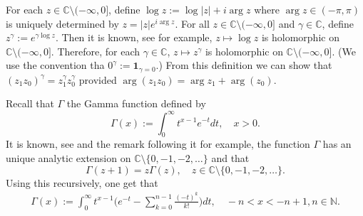 \documentclass[12pt]{amsart}
\theoremstyle{plain}
\theoremstyle{definition}
\numberwithin{equation}{section}
\begin{document}
	For each $z\in \mathbb C\setminus (-\infty,0]$, define
$
	\log z := \log |z| + i \arg z
$
	where $\arg z \in (-\pi,\pi)$ is uniquely determined by
$
	z = |z|e^{i \arg z}.
$ 	
	For all $z\in \mathbb C\setminus (-\infty,0]$ and $\gamma \in \mathbb C$, define
$
	z^\gamma := e^{\gamma \log z}.
$
	Then it is known, see \cite[Theorem 6.1]{SteinShakarchi2003Complex} for example, $z\mapsto \log z$ is holomorphic on $\mathbb C\setminus (-\infty,0]$.
	Therefore, for each $\gamma \in \mathbb C$, $z\mapsto z^\gamma$ is holomorphic on $\mathbb C\setminus (-\infty,0]$.
(We use the convention tha  $0^\gamma := \mathbf 1_{\gamma = 0}$.)
    From this definition we can show that $(z_1z_0)^\gamma = z_1^\gamma z_0^\gamma$ provided $\arg (z_1z_0)=\arg z_1 + \arg(z_0)$.


    Recall that $\Gamma$ the Gamma function defined by
\begin{equation}
    \Gamma (x) := \int_0^\infty t^{x-1} e^{-t}dt,
    \quad x>0.
\end{equation}
	It is known, see \cite[Theorem 6.1.3]{SteinShakarchi2003Complex} and the remark following it for example, the function $\Gamma$ has an unique analytic extension on $\mathbb C\setminus\{0, -1,-2,\dots\}$ and that
\[
	\Gamma(z+1) = z \Gamma(z),\quad z\in \mathbb C\setminus\{0, -1,-2,\dots\}.
\]
	Using this recursively, one get that
\begin{align}
\label{eq: definition of Gamma function}
    \Gamma(x)
    := \int_0^\infty t^{x-1} \Big(e^{-t} - \sum_{k=0}^{n-1} \frac{(-t)^k}{k!}\Big) dt,
    \quad -n< x< -n+1, n\in \mathbb N.
\end{align}
\end{document}

